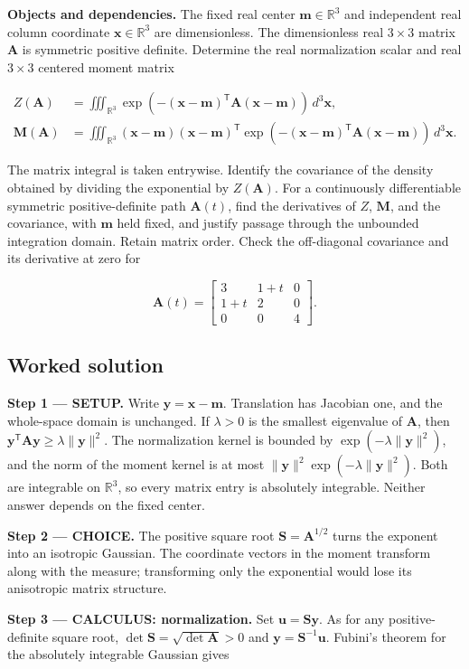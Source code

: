 \documentclass[11pt,oneside,openany]{book}
\begin{document}
\textbf{Objects and dependencies.} The fixed real center \(\mathbf m\in\mathbb R^3\) and independent real column coordinate \(\mathbf x\in\mathbb R^3\) are dimensionless. The dimensionless real \(3\times3\) matrix \(\mathbf A\) is symmetric positive definite. Determine the real normalization scalar and real \(3\times3\) centered moment matrix

\[
\begin{aligned}
Z(\mathbf A)&=\iiint_{\mathbb R^3}
\exp(-(\mathbf x-\mathbf m)^{\mathsf T}\mathbf A(\mathbf x-\mathbf m))\,d^3\mathbf x,\\
\mathbf M(\mathbf A)&=\iiint_{\mathbb R^3}
(\mathbf x-\mathbf m)(\mathbf x-\mathbf m)^{\mathsf T}
\exp(-(\mathbf x-\mathbf m)^{\mathsf T}\mathbf A(\mathbf x-\mathbf m))\,d^3\mathbf x.
\end{aligned}
\]

The matrix integral is taken entrywise. Identify the covariance of the density obtained by dividing the exponential by \(Z(\mathbf A)\). For a continuously differentiable symmetric positive-definite path \(\mathbf A(t)\), find the derivatives of \(Z\), \(\mathbf M\), and the covariance, with \(\mathbf m\) held fixed, and justify passage through the unbounded integration domain. Retain matrix order. Check the off-diagonal covariance and its derivative at zero for

\[
\mathbf A(t)=\begin{bmatrix}3&1+t&0\\1+t&2&0\\0&0&4\end{bmatrix}.
\]
\subsection*{Worked solution}

\textbf{Step 1 --- SETUP.} Write \(\mathbf y=\mathbf x-\mathbf m\). Translation has Jacobian one, and the whole-space domain is unchanged. If \(\lambda>0\) is the smallest eigenvalue of \(\mathbf A\), then \(\mathbf y^{\mathsf T}\mathbf A\mathbf y\ge\lambda\|\mathbf y\|^2\). The normalization kernel is bounded by \(\exp(-\lambda\|\mathbf y\|^2)\), and the norm of the moment kernel is at most \(\|\mathbf y\|^2\exp(-\lambda\|\mathbf y\|^2)\). Both are integrable on \(\mathbb R^3\), so every matrix entry is absolutely integrable. Neither answer depends on the fixed center.

\begin{ChoiceStep}
\textbf{Step 2 --- CHOICE.} The positive square root \(\mathbf S=\mathbf A^{1/2}\) turns the exponent into an isotropic Gaussian. The coordinate vectors in the moment transform along with the measure; transforming only the exponential would lose its anisotropic matrix structure.

\end{ChoiceStep}
\textbf{Step 3 --- CALCULUS: normalization.} Set \(\mathbf u=\mathbf S\mathbf y\). As for any positive-definite square root, \(\det\mathbf S=\sqrt{\det\mathbf A}>0\) and \(\mathbf y=\mathbf S^{-1}\mathbf u\). Fubini's theorem for the absolutely integrable Gaussian gives
\end{document}
